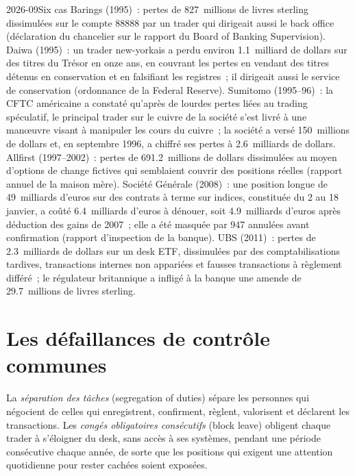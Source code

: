 \begin{dated}{2026-09}{Six cas}\label{dat:rc:operational-risk-and-rogue-trading:cases}
Barings (1995)~: pertes de 827~millions de livres sterling dissimulées sur le compte 88888 par un trader qui dirigeait aussi le
back office (déclaration du chancelier sur le rapport du Board of Banking Supervision). Daiwa (1995)~:
un trader new-yorkais a perdu environ 1.1~milliard de dollars sur des titres du Trésor en onze ans, en couvrant les
pertes en vendant des titres détenus en conservation et en falsifiant les registres~; il dirigeait aussi le service de conservation
(ordonnance de la Federal Reserve). Sumitomo (1995--96)~: la CFTC américaine a constaté qu'après de lourdes pertes liées au
trading spéculatif, le principal trader sur le cuivre de la société s'est livré à une manœuvre visant à manipuler les
cours du cuivre~; la société a versé 150~millions de dollars et, en septembre 1996, a chiffré ses pertes à 2.6~milliards de dollars.
Allfirst (1997--2002)~: pertes de 691.2~millions de dollars dissimulées au moyen d'options de change fictives qui
semblaient couvrir des positions réelles (rapport annuel de la maison mère). Société Générale (2008)~: une position
longue de 49~milliards d'euros sur des contrats à terme sur indices, constituée du 2 au 18 janvier, a coûté 6.4~milliards d'euros à dénouer,
soit 4.9~milliards d'euros après déduction des gains de 2007~; elle a été masquée par 947  annulées avant confirmation
(rapport d'inspection de la banque). UBS (2011)~: pertes de 2.3~milliards de dollars sur un desk ETF, dissimulées par des
comptabilisations tardives, transactions internes non appariées et fausses transactions à règlement différé~; le régulateur britannique a infligé
à la banque une amende de 29.7~millions de livres sterling.
\end{dated}

\section{Les défaillances de contrôle communes}

\begin{definition}\label{def:rc:operational-risk-and-rogue-trading:sod}
La \emph{séparation des tâches} (segregation of duties) sépare les personnes qui négocient de celles qui
enregistrent, confirment, règlent, valorisent et déclarent les transactions. Les \emph{congés obligatoires consécutifs} (block leave) obligent chaque
trader à s'éloigner du desk, sans accès à ses systèmes, pendant une période consécutive chaque année, de sorte que
les positions qui exigent une attention quotidienne pour rester cachées soient exposées.
\end{definition}

